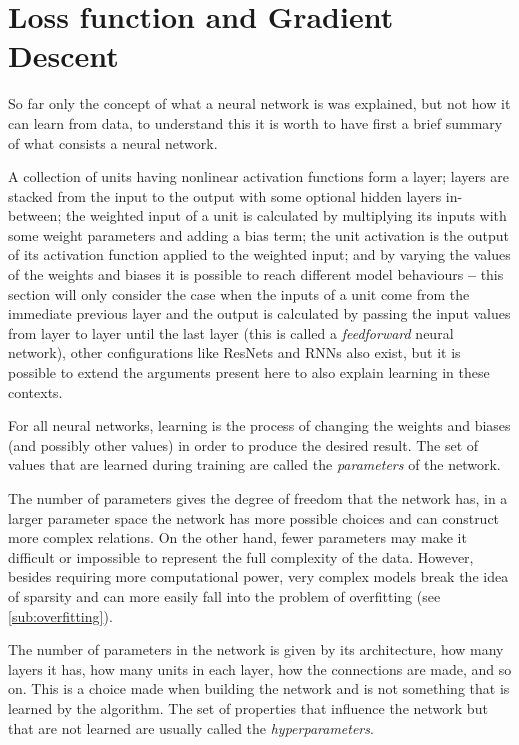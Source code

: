 \section{Loss function and Gradient Descent} \label{sec:loss_&_gradient_descent}
So far only the concept of what a neural network is was explained, but not how it can learn from data, to understand this it is worth to have first a brief summary of what consists a neural network.

A collection of units having nonlinear activation functions form a layer; layers are stacked from the input to the output with some optional hidden layers in-between; the weighted input of a unit is calculated by multiplying its inputs with some weight parameters and adding a bias term; the unit activation is the output of its activation function applied to the weighted input; and by varying the values of the weights and biases it is possible to reach different model behaviours \textbf{--} this section will only consider the case when the inputs of a unit come from the immediate previous layer and the output is calculated by passing the input values from layer to layer until the last layer (this is called a \textit{feedforward} neural network), other configurations like \acp{ResNet} \cite{resnet2015} and \acp{RNN} also exist, but it is possible to extend the arguments present here to also explain learning in these contexts.

For all neural networks, learning is the process of changing the weights and biases (and possibly other values) in order to produce the desired result. The set of values that are learned during training are called the \textit{parameters} of the network.

The number of parameters gives the degree of freedom that the network has, in a larger parameter space the network has more possible choices and can construct more complex relations. On the other hand, fewer parameters may make it difficult or impossible to represent the full complexity of the data. However, besides requiring more computational power, very complex models break the idea of sparsity and can more easily fall into the problem of overfitting (see \autoref{sub:overfitting}).

The number of parameters in the network is given by its architecture, how many layers it has, how many units in each layer, how the connections are made, and so on. This is a choice made when building the network and is not something that is learned by the algorithm. The set of properties that influence the network but that are not learned are usually called the \textit{hyperparameters}. 

